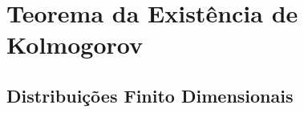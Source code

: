\chapter[Aula 11]{Teorema da Existência de Kolmogorov}
\chaptermark{}

\section{Distribuições Finito Dimensionais}
